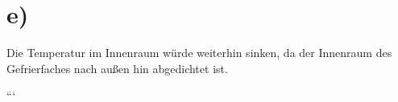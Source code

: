 

\section*{e)}
Die Temperatur im Innenraum würde weiterhin sinken, da der Innenraum des Gefrierfaches nach außen hin abgedichtet ist.

```